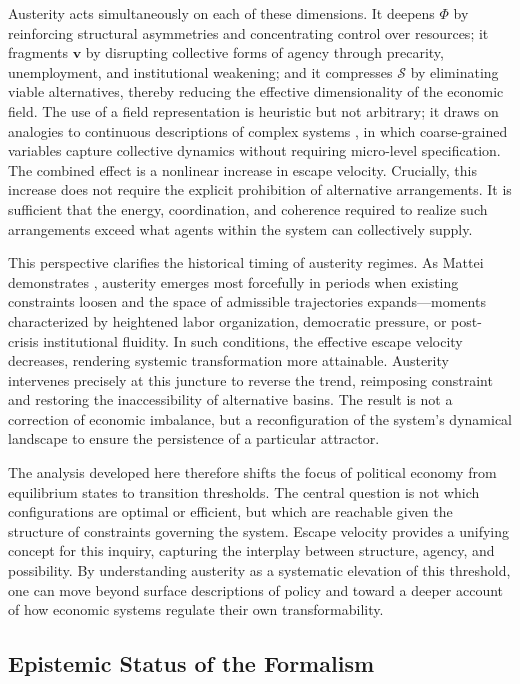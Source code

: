 \documentclass[11pt, a4paper]{article}
\begin{document}
Austerity acts simultaneously on each of these dimensions. It deepens $\Phi$ by reinforcing structural asymmetries and concentrating control over resources; it fragments $\mathbf{v}$ by disrupting collective forms of agency through precarity, unemployment, and institutional weakening; and it compresses $\mathcal{S}$ by eliminating viable alternatives, thereby reducing the effective dimensionality of the economic field. The use of a field representation is heuristic but not arbitrary; it draws on analogies to continuous descriptions of complex systems \cite{anderson1972,holland1992}, in which coarse-grained variables capture collective dynamics without requiring micro-level specification. The combined effect is a nonlinear increase in escape velocity. Crucially, this increase does not require the explicit prohibition of alternative arrangements. It is sufficient that the energy, coordination, and coherence required to realize such arrangements exceed what agents within the system can collectively supply.

This perspective clarifies the historical timing of austerity regimes. As Mattei demonstrates \cite{mattei2022}, austerity emerges most forcefully in periods when existing constraints loosen and the space of admissible trajectories expands---moments characterized by heightened labor organization, democratic pressure, or post-crisis institutional fluidity. In such conditions, the effective escape velocity decreases, rendering systemic transformation more attainable. Austerity intervenes precisely at this juncture to reverse the trend, reimposing constraint and restoring the inaccessibility of alternative basins. The result is not a correction of economic imbalance, but a reconfiguration of the system's dynamical landscape to ensure the persistence of a particular attractor.

The analysis developed here therefore shifts the focus of political economy from equilibrium states to transition thresholds. The central question is not which configurations are optimal or efficient, but which are reachable given the structure of constraints governing the system. Escape velocity provides a unifying concept for this inquiry, capturing the interplay between structure, agency, and possibility. By understanding austerity as a systematic elevation of this threshold, one can move beyond surface descriptions of policy and toward a deeper account of how economic systems regulate their own transformability.

\subsection{Epistemic Status of the Formalism}
\end{document}
